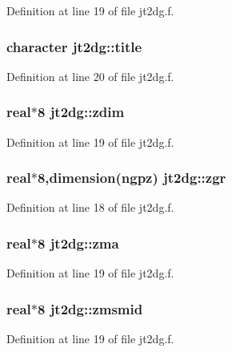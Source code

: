 Definition at line 19 of file jt2dg.f.\hypertarget{namespacejt2dg_c32ba1b009dff05e5ec89ca21de79ee1}{
\subsubsection[title]{\setlength{\rightskip}{0pt plus 5cm}character {\bf jt2dg::title}}}
\label{namespacejt2dg_c32ba1b009dff05e5ec89ca21de79ee1}




Definition at line 20 of file jt2dg.f.\hypertarget{namespacejt2dg_4e55ac9b9c6c4c69545058d6b2194852}{
\subsubsection[zdim]{\setlength{\rightskip}{0pt plus 5cm}real$\ast$8 {\bf jt2dg::zdim}}}
\label{namespacejt2dg_4e55ac9b9c6c4c69545058d6b2194852}




Definition at line 19 of file jt2dg.f.\hypertarget{namespacejt2dg_60cde3de8e847fbf8f420fe9ce5f465d}{
\subsubsection[zgr]{\setlength{\rightskip}{0pt plus 5cm}real$\ast$8,dimension(ngpz) {\bf jt2dg::zgr}}}
\label{namespacejt2dg_60cde3de8e847fbf8f420fe9ce5f465d}




Definition at line 18 of file jt2dg.f.\hypertarget{namespacejt2dg_61fcb02be858569f8d4d26baf5a40611}{
\subsubsection[zma]{\setlength{\rightskip}{0pt plus 5cm}real$\ast$8 {\bf jt2dg::zma}}}
\label{namespacejt2dg_61fcb02be858569f8d4d26baf5a40611}




Definition at line 19 of file jt2dg.f.\hypertarget{namespacejt2dg_201bfea2375282f6c8c0fd2b5c51a3fa}{
\subsubsection[zmsmid]{\setlength{\rightskip}{0pt plus 5cm}real$\ast$8 {\bf jt2dg::zmsmid}}}
\label{namespacejt2dg_201bfea2375282f6c8c0fd2b5c51a3fa}




Definition at line 19 of file jt2dg.f.